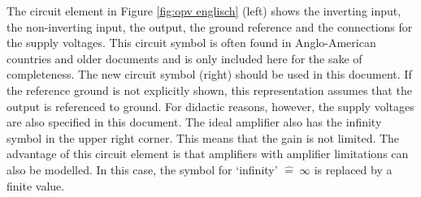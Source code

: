 {\begin{frame}
    The circuit element in Figure \ref{fig:opv englisch} (left) shows the inverting input, the 
    non-inverting input, the output, the ground reference and the 
    connections for the supply voltages. This circuit symbol is 
    often found in Anglo-American countries and older documents and is only included here 
    for the sake of completeness. 
    The new circuit symbol (right) should be used in this document. If the reference ground is not explicitly shown, this representation assumes that 
    the output is referenced to ground.
    For didactic reasons, however, the supply voltages are also specified in this document. The ideal amplifier also has the infinity symbol in the upper 
    right corner. This means that the gain is not limited. The advantage of this circuit element is that amplifiers with amplifier limitations can also be modelled. In this case, the symbol for ‘infinity’ $\widehat{=}~\infty$ is replaced by a finite value.




    \begin{figure}[ht]
        \centering
    \end{figure}
\end{frame}}
